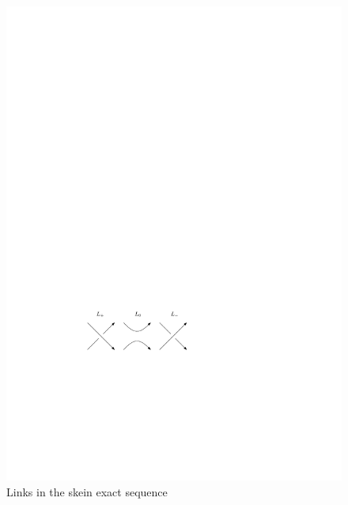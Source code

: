 \begin{figure}[tb]
\centering
\includegraphics[scale=1]{graphics/skein-links}
\caption{Links in the skein exact sequence}
\label{skein-links}
\end{figure}

